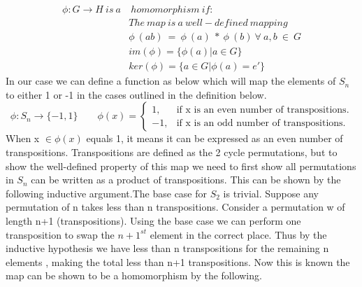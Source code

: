 \documentclass{article}
\begin{document}
\begin{align*}
\phi : G\rightarrow H\ is\ a&\ homomorphism\ if: \\
& The\ map\ is\ a\ well-defined\ mapping \\
&\phi\ (ab)\ =\ \phi\ (a)\ *\ \phi\ (b)\ \forall\ a,b\ \in\ G\\
&im(\phi) = \{\phi(a) | a \in G\}\\
&ker(\phi)= \{a\in G |\phi(a) = e'\}
\end{align*}
In our case we can define a function as below which will map the elements of $S_{n}$ to either 1 or -1 in the cases outlined in the definition below.
\begin{equation}
\phi : S_{n} \rightarrow \{-1,1\} \qquad
  \phi(x)=\begin{cases}
    1, & \text{if x is an even number of transpositions}.\\
    -1, & \text{if x is an odd number of transpositions}.
  \end{cases}
\end{equation}
When x $\in \phi(x)$ equals 1, it means it can be expressed as an even number of transpositions. Transpositions are defined as the 2 cycle permutations, but to show the well-defined property of this map  we need to first show all permutations in $S_{n}$ can be written as a product of transpositions.%
This can be shown by the following inductive argument.The base case for $S_{2}$ is trivial. Suppose any permutation of n takes less than n transpositions. Consider a permutation w of length n+1 (transpositions). Using the base case we can perform one transposition to swap the $n+1^{st}$ element in the correct place. Thus by the inductive hypothesis we have less than n transpositions for the remaining n elements , making the total less than n+1 transpositions. 
Now this is known the map can be shown to be a homomorphism by the following.
\end{document}
